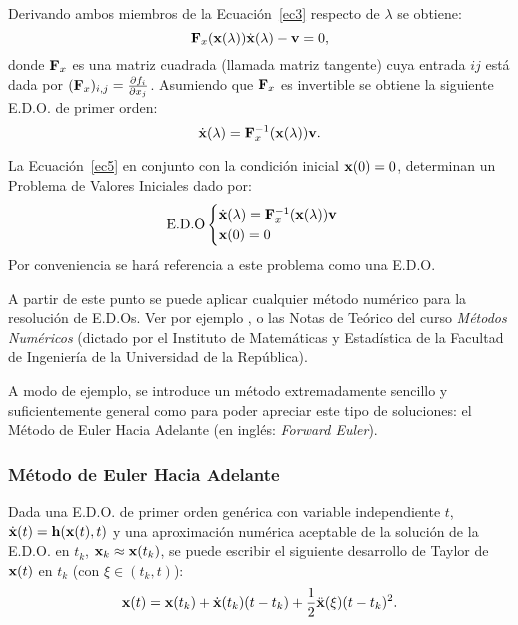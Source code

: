 Derivando ambos miembros de la Ecuación~\eqref{ec3} respecto de $\lambda$ se obtiene:
%
\begin{equation}\label{ec4}
{\bf F}_x({\bf x}(\lambda))\dot{{\bf x}}(\lambda)-{\bf v}=0,
\end{equation}
%
donde ${\bf F}_x$ es una matriz cuadrada (llamada matriz tangente) cuya entrada $ij$ está dada por $({\bf F}_x)_{i,j}=\frac{\partial f_i}{\partial x_j}$. %
%
Asumiendo que ${\bf F}_x$ es invertible se obtiene la siguiente E.D.O. de primer orden:
%
\begin{equation}\label{ec5}
\dot{{\bf x}}(\lambda)={\bf F}_x^{-1}({\bf x}(\lambda)){\bf v}.
\end{equation}

La Ecuación~\eqref{ec5} en conjunto con la condición inicial ${\bf x}(0)=0$, determinan un Problema de Valores Iniciales dado por:
%
\begin{equation}\label{EDO}
\text{E.D.O}
	\begin{cases} 
		\dot{{\bf x}}(\lambda)={\bf F}_x^{-1}({\bf x}(\lambda)){\bf v} \\
		{\bf x}(0)=0
	\end{cases}
\end{equation}
%
Por conveniencia se hará referencia a este problema como una E.D.O. %

A partir de este punto se puede aplicar cualquier método numérico para la resolución de E.D.Os. %
%
Ver por ejemplo \citep{kahaner1989numerical}, \citep{butcher2004numerical} o las Notas de Teórico del curso \textit{Métodos Numéricos} (dictado por el Instituto de Matemáticas y Estadística de la Facultad de Ingeniería de la Universidad de la República).

A modo de ejemplo, se introduce un método extremadamente sencillo y suficientemente general como para poder apreciar este tipo de soluciones: el Método de Euler Hacia Adelante (en inglés: \textit{Forward Euler}).

\subsubsection{Método de Euler Hacia Adelante}\label{FEuler}

Dada una E.D.O. de primer orden genérica con variable independiente $t$, $\dot{{\bf x}}(t)={\bf h}({\bf x}(t),t)$ y una aproximación numérica aceptable de la solución de la E.D.O. en $t_k$, ${\bf x}_k\approx {\bf x}(t_k)$, se puede escribir el siguiente desarrollo de Taylor de ${\bf x}(t)$ en $t_k$ (con $\xi\in(t_k,t)$):
%
\begin{equation}\label{ec6}
{\bf x}(t)={\bf x}(t_k) + \dot{{\bf x}}(t_k)(t-t_k) + \frac{1}{2}\ddot{{\bf x}}(\xi)(t-t_k)^2.
\end{equation}

